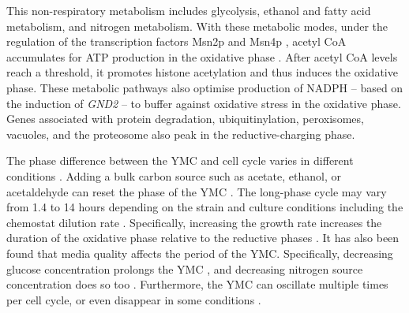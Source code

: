 \begin{enumerate}
  This non-respiratory metabolism includes glycolysis, ethanol and fatty acid metabolism, and nitrogen metabolism.
  With these metabolic modes, under the regulation of the transcription factors Msn2p and Msn4p \citep{kuangMsn2RegulateExpression2017}, acetyl CoA accumulates for ATP production in the oxidative phase \citep{tuLogicYeastMetabolic2005}.
After acetyl CoA levels reach a threshold, it promotes histone acetylation and thus induces the oxidative phase.
These metabolic pathways also optimise production of NADPH -- based on the induction of \emph{GND2} -- to buffer against oxidative stress in the oxidative phase.
Genes associated with protein degradation, ubiquitinylation, peroxisomes, vacuoles, and the proteosome also peak in the reductive-charging phase.
\end{enumerate}


The phase difference between the YMC and cell cycle varies in different conditions %
\citep{ewaldYeastCyclinDependentKinase2016}. %
Adding a bulk carbon source such as acetate, ethanol, or acetaldehyde can reset the phase of the YMC \citep{kuangMsn2RegulateExpression2017, krishnaMinimalPushPull2018}.
The long-phase cycle may vary from 1.4 to 14 hours depending on the strain and culture conditions including the chemostat dilution rate \citep{caustonMetabolicRhythmsFramework2018}. %
Specifically, increasing the growth rate increases the duration of the oxidative phase relative to the reductive phases \citep{slavovCouplingGrowthRate2011}.
It has also been found that media quality affects the period of the YMC.
Specifically, decreasing glucose concentration prolongs the YMC \citep{mellorMolecularBasisMetabolic2016,papagiannakisAutonomousMetabolicOscillations2017},
and decreasing nitrogen source concentration does so too \citep{baumgartnerFlavinbasedMetabolicCycles2018}.
Furthermore, the YMC can oscillate multiple times per cell cycle, or even disappear in some conditions \citep{baumgartnerFlavinbasedMetabolicCycles2018}. %

